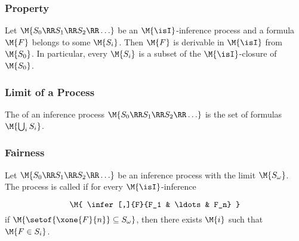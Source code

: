 
	   \begin{frame}\frametitle{Property}

  Let $\M{S_0 \RR S_1 \RR S_2 \RR \ldots}$ be an $\M{\isI}$-inference process
  and a formula $\M{F}$ belongs to some $\M{S_i}$. Then $\M{F}$ is derivable in
  $\M{\isI}$ from $\M{S_0}$. In particular, every $\M{S_i}$ is a subset of the
  $\M{\isI}$-closure of $\M{S_0}$.


                           \end{frame}


	   \begin{frame}\frametitle{Limit of a Process}

The  of an inference process
$\M{S_0 \RR S_1 \RR S_2 \RR \ldots}$
is the set of formulas $\M{\bigcup_i S_i}$.

\medskip


\medskip


\bigskip


                           \end{frame}


	   \begin{frame}\frametitle{Fairness}

  Let $\M{S_0 \RR S_1 \RR S_2 \RR \ldots}$ be an inference process with
  the limit $\M{S_\omega}$. The process 
  is called  if for every 
  $\M{\isI}$-inference

    \[\M{
      \infer[,]{F}{F_1 & \ldots & F_n}
    }\]
  if $\M{\setof{\xone{F}{n}} \subseteq S_\omega}$, then
  there exists $\M{i}$ such that $\M{F \in S_i}$.


                           \end{frame}


